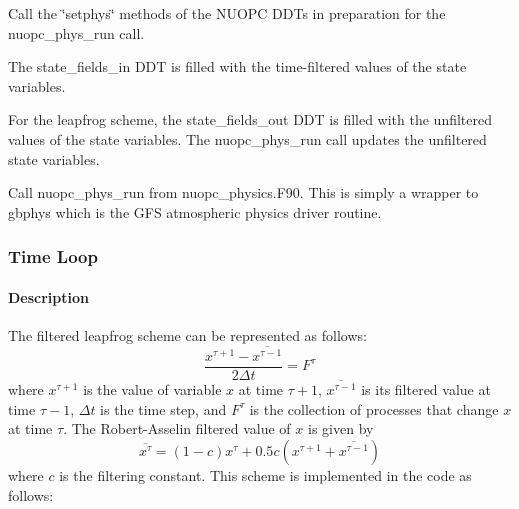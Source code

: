\begin{DoxyItemize}
\item Call the \char`\"{}setphys\char`\"{} methods of the N\+U\+O\+PC D\+D\+Ts in preparation for the nuopc\+\_\+phys\+\_\+run call.
\begin{DoxyItemize}
\item The state\+\_\+fields\+\_\+in D\+DT is filled with the time-\/filtered values of the state variables.
\item For the leapfrog scheme, the state\+\_\+fields\+\_\+out D\+DT is filled with the unfiltered values of the state variables. The nuopc\+\_\+phys\+\_\+run call updates the unfiltered state variables.
\end{DoxyItemize}
\item Call nuopc\+\_\+phys\+\_\+run from nuopc\+\_\+physics.\+F90. This is simply a wrapper to gbphys which is the G\+FS atmospheric physics driver routine.
\end{DoxyItemize}\hypertarget{group___s_c_m_time_loop}{}\subsubsection{Time Loop}\label{group___s_c_m_time_loop}
\hypertarget{group___s_c_m_time_loop_description}{}\paragraph{Description}\label{group___s_c_m_time_loop_description}
The filtered leapfrog scheme can be represented as follows\+: \[ \frac{x^{\tau + 1} - \overline{x^{\tau - 1}}}{2\Delta t}=F^\tau \] where $x^{\tau + 1}$ is the value of variable $x$ at time $\tau + 1$, $\overline{x^{\tau - 1}}$ is its filtered value at time $\tau - 1$, $\Delta t$ is the time step, and $F^\tau$ is the collection of processes that change $x$ at time $\tau$. The Robert-\/\+Asselin filtered value of $x$ is given by \[ \overline{x^\tau}=(1-c)x^\tau + 0.5c\left(x^{\tau +1} + \overline{x^{\tau - 1}}\right) \] where $c$ is the filtering constant. This scheme is implemented in the code as follows\+:
